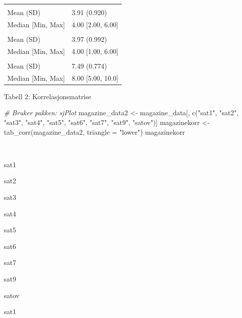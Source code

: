 \documentclass[
]{article}
\newenvironment{Shaded}{\begin{snugshade}}{\end{snugshade}}
\newcommand{\AttributeTok}[1]{\textcolor[rgb]{0.77,0.63,0.00}{#1}}
\newcommand{\CommentTok}[1]{\textcolor[rgb]{0.56,0.35,0.01}{\textit{#1}}}
\newcommand{\FunctionTok}[1]{\textcolor[rgb]{0.00,0.00,0.00}{#1}}
\newcommand{\NormalTok}[1]{#1}
\newcommand{\OtherTok}[1]{\textcolor[rgb]{0.56,0.35,0.01}{#1}}
\newcommand{\StringTok}[1]{\textcolor[rgb]{0.31,0.60,0.02}{#1}}
\begin{document}
\begin{tabular}[t]{ll}
\addlinespace[0.3em]
\multicolumn{2}{l}{\textbf{sat8}}\\
\hspace{1em}Mean (SD) & 3.91 (0.920)\\
\hspace{1em}Median [Min, Max] & 4.00 [2.00, 6.00]\\
\addlinespace[0.3em]
\multicolumn{2}{l}{\textbf{sat9}}\\
\hspace{1em}Mean (SD) & 3.97 (0.992)\\
\hspace{1em}Median [Min, Max] & 4.00 [1.00, 6.00]\\
\addlinespace[0.3em]
\multicolumn{2}{l}{\textbf{satov}}\\
\hspace{1em}Mean (SD) & 7.49 (0.774)\\
\hspace{1em}Median [Min, Max] & 8.00 [5.00, 10.0]\\
\bottomrule
\end{tabular}

Tabell 2: Korrelasjonsmatrise

\begin{Shaded}
\begin{Highlighting}[]
\CommentTok{\# Bruker pakken: sjPlot}
\NormalTok{magazine\_data2 }\OtherTok{\textless{}{-}}\NormalTok{ magazine\_data[, }\FunctionTok{c}\NormalTok{(}\StringTok{"sat1"}\NormalTok{, }\StringTok{"sat2"}\NormalTok{, }\StringTok{"sat3"}\NormalTok{, }\StringTok{"sat4"}\NormalTok{, }\StringTok{"sat5"}\NormalTok{, }\StringTok{"sat6"}\NormalTok{, }\StringTok{"sat7"}\NormalTok{, }\StringTok{"sat9"}\NormalTok{, }\StringTok{"satov"}\NormalTok{)]}
\NormalTok{magazinekorr }\OtherTok{\textless{}{-}} \FunctionTok{tab\_corr}\NormalTok{(magazine\_data2, }\AttributeTok{triangle =} \StringTok{"lower"}\NormalTok{)}
\NormalTok{magazinekorr}
\end{Highlighting}
\end{Shaded}

~

sat1

sat2

sat3

sat4

sat5

sat6

sat7

sat9

satov

sat1
\end{document}

